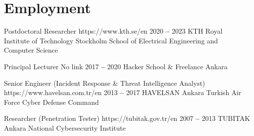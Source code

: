 

\section{Employment}

  
    \itemizeCVBegin[nolabel]{}
    
        \educationItem
            {Postdoctoral Researcher}
            {https://www.kth.se/en}
            {2020 \textbf{--} 2023}
            {KTH Royal Institute of Technology}
            {Stockholm}
            \small School of Electrical Engineering and Computer Science
            
        \educationItem
            {Principal Lecturer}
            {No link}
            {2017 \textbf{--} 2020}
            {Hacker School \& Freelance}
            {Ankara}
            \small

        \educationItem
            {Senior Engineer (Incident Response \& Threat Intelligence Analyst)}
            {https://www.havelsan.com.tr/en}
            {2013 \textbf{--} 2017}
            {HAVELSAN}
            {Ankara}
            \small Turkish Air Force Cyber Defense Command

        \educationItem
            {Researcher (Penetration Tester)}
            {https://tubitak.gov.tr/en}
            {2007 \textbf{--} 2013}
            {TUBITAK}
            {Ankara}
            \small National Cybersecurity Institute

    \itemizeCVEnd